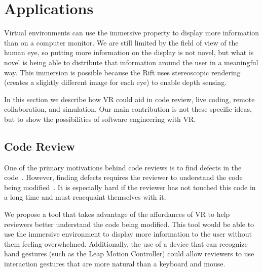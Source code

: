 \documentclass{acm_proc_article-sp}
\begin{document}
\section{Applications}
Virtual environments can use the immersive property to display more information than on a computer monitor. We are still limited by the field of view of the human eye, so putting more information on the display is not novel, but what is novel is being able to distribute that information around the user in a meaningful way. This immersion is possible because the Rift uses stereoscopic rendering (creates a slightly different image for each eye) to enable depth sensing.

In this section we describe how VR could aid in code review, live coding, remote collaboration, and simulation. Our main contribution is not these specific ideas, but to show the possibilities of software engineering with VR.

\subsection{Code Review}
One of the primary motivations behind code reviews is to find defects in the code~\cite{bacchelli:ModernCodeReviewChallenges}. However, finding defects requires the reviewer to understand the code being modified~\cite{bacchelli:ModernCodeReviewChallenges}. It is especially hard if the reviewer has not touched this code in a long time and must reacquaint themselves with it.

We propose a tool that takes advantage of the affordances of VR to help reviewers better understand the code being modified. This tool would be able to use the immersive environment to display more information to the user without them feeling overwhelmed. Additionally, the use of a device that can recognize hand gestures (such as the Leap Motion Controller) could allow reviewers to use interaction gestures that are more natural than a keyboard and mouse. 

    
\end{document}
